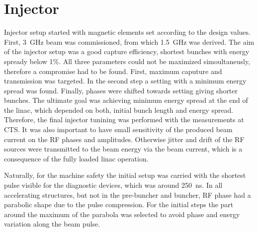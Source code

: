 \section{Injector}

Injector setup started with magnetic elements set according to 
the design values. First, 3~GHz beam was commissioned, from which 1.5~GHz was derived.
The aim of the injector setup was a good capture efficiency, shortest bunches with energy spready below 1\%.
All three parameters could not be maximized simoultaneusly, therefore a compromise had to be found.
First, maximum caputure and transmission was targeted. 
In the second step a setting with a minimum energy spread was found. 
Finally, phases were shifted towards setting giving shorter bunches.
The ultimate goal was achieving minimum energy spread at the end of the linac, which depended on both, 
initial bunch length and energy spread.
Therefore, the final injector tunining was performed with the measurements at CTS.
It was also important to have small sensitivity of the produced beam current
on the RF phases and amplitudes. Otherwise jitter and drift of the RF sources 
were transmitted to the beam energy via the beam current, which is a consequence of 
the fully loaded linac operation. 


Naturally, for the machine safety the initial setup was carried with
the shortest pulse visible for the diagnostic devices, which was around 250~ns.
In all accelerating structures, but not in the pre-buncher and buncher,
RF phase had a parabolic shape due to the pulse compression.
For the initial steps the part around the maximum of the parabola was selected to avoid 
phase and energy variation along the beam pulse.

